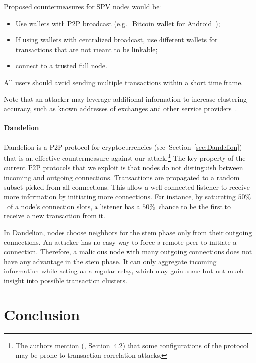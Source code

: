 Proposed countermeasures for SPV nodes would be:

\begin{itemize}
	\item Use wallets with P2P broadcast (e.g.,~Bitcoin wallet for Android~\cite{BitcoinWallet});
	\item If using wallets with centralized broadcast, use different wallets for transactions that are not meant to be linkable;
	\item connect to a trusted full node.
\end{itemize}

All users should avoid sending multiple transactions within a short time frame.

Note that an attacker may leverage additional information to increase clustering accuracy, such as known addresses of exchanges and other service providers~\cite{Walletexplorer}.

\paragraph{Dandelion}
Dandelion is a P2P protocol for cryptocurrencies (see~Section~\ref{sec:Dandelion}) that is an effective countermeasure against our attack.\footnote{The authors mention (\cite{Fanti2018}, Section~4.2) that some configurations of the protocol may be prone to transaction correlation attacks.}
The key property of the current P2P protocols that we exploit is that nodes do not distinguish between incoming and outgoing connections.
Transactions are propagated to a random subset picked from all connections.
This allow a well-connected listener to receive more information by initiating more connections.
For instance, by saturating $50\%$~of a node's connection slots, a listener has a $50\%$~chance to be the first to receive a new transaction from it.

In Dandelion, nodes choose neighbors for the stem phase only from their outgoing connections.
An attacker has no easy way to force a remote peer to initiate a connection.
Therefore, a malicious node with many outgoing connections does not have any advantage in the stem phase.
It can only aggregate incoming information while acting as a regular relay, which may gain some but not much insight into possible transaction clusters.


\section{Conclusion} \label{sec:Ch03Conclusion}


